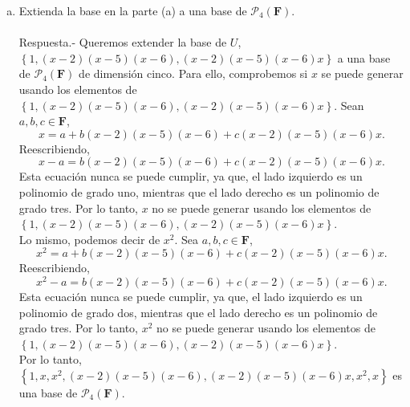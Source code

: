 \begin{enumerate}[\bfseries 1.]
\begin{enumerate}[(a)]
	    Ahora, si $p(x)\in U$, siempre que $q(x)=p(x)-p(2)\in V$, y viceversa. Sea $c=p(2)=p(5)=p(6)$ con $q(x)\in V$, por lo que podemos expresar a $p\in U$ como $c+q(x)$. \\

	    Ya que, $\left\{(x-2)(x-5)(x-6),(x-2)(x-5)(x-6)x\right\}$ genera $V$, entonces
	    $$p(x)=c+a(x-2)(x-5)(x-6)+b(x-2)(x-5)(x-6)x.$$
	    Por lo tanto, $\left\{1,(x-2)(x-5)(x-6),(x-2)(x-5)(x-6)x\right\}$ genera $U$. Por último, notemos que $1\notin \span\left[(x-2)(x-5)(x-6),(x-2)(x-5)(x-6)x\right]$. Así, 
	    $$\left\{1,(x-2)(x-5)(x-6),(x-2)(x-5)(x-6)x\right\}$$
	    es linealmente independiente. Por lo tanto, es una base de $U$.\\\\

	    \item Extienda la base en la parte (a) a una base de $\mathcal{P}_4(\textbf{F})$.\\\\
		Respuesta.-\; Queremos extender la base de $U$, $\left\{1,(x-2)(x-5)(x-6),(x-2)(x-5)(x-6)x\right\}$ a una base de $\mathcal{P}_4(\textbf{F})$ de dimensión cinco. Para ello, comprobemos si $x$ se puede generar usando los elementos de $\left\{1,(x-2)(x-5)(x-6),(x-2)(x-5)(x-6)x\right\}$. Sean $a,b,c\in \textbf{F}$,
		$$x=a+b(x-2)(x-5)(x-6)+c(x-2)(x-5)(x-6)x.$$
		Reescribiendo,
		$$x-a=b(x-2)(x-5)(x-6)+c(x-2)(x-5)(x-6)x.$$
		Esta ecuación nunca se puede cumplir, ya que, el lado izquierdo es un polinomio de grado uno, mientras que el lado derecho es un polinomio de grado tres. Por lo tanto, $x$ no se puede generar usando los elementos de $\left\{1,(x-2)(x-5)(x-6),(x-2)(x-5)(x-6)x\right\}$.\\

		Lo mismo, podemos decir de $x^2$. Sea $a,b,c\in \textbf{F}$,
		$$x^2=a+b(x-2)(x-5)(x-6)+c(x-2)(x-5)(x-6)x.$$
		Reescribiendo,
		$$x^2-a=b(x-2)(x-5)(x-6)+c(x-2)(x-5)(x-6)x.$$
		Esta ecuación nunca se puede cumplir, ya que, el lado izquierdo es un polinomio de grado dos, mientras que el lado derecho es un polinomio de grado tres. Por lo tanto, $x^2$ no se puede generar usando los elementos de $\left\{1,(x-2)(x-5)(x-6),(x-2)(x-5)(x-6)x\right\}$.\\

		Por lo tanto, $\left\{1,x,x^2,(x-2)(x-5)(x-6),(x-2)(x-5)(x-6)x,x^2,x\right\}$ es una base de $\mathcal{P}_4(\textbf{F})$.\\\\



\end{enumerate}
\end{enumerate}
